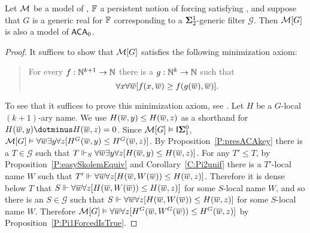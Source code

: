\begin{thm}\label{T:presACA}
Let $\mathcal{M}$ be a model of \ACAo, $\mathbb{F}$ a persistent notion of forcing satisfying \MCP,
and suppose that $G$ is a generic real for $\mathbb{F}$
corresponding to a $\mathbf{\Sigma}^1_2$-generic filter $\mathcal{G}$.
Then $\mathcal{M}[G]$ is also a model of $\mathsf{ACA}_0$.
\end{thm}
\begin{proof}
It suffices to show that $\mathcal{M}[G]$ satisfies
the following minimization axiom:
\begin{quote}
For every $f:\mathbb{N}^{k+1}\to\mathbb{N}$ there is a $g:\mathbb{N}^k\to\mathbb{N}$ such that
$$\forall x\forall\overline{w}[f(x,\overline{w})\geq f(g(\overline{w}),\overline{w})].$$
\end{quote}
To see that it suffices to prove this minimization axiom, see \cite{varMathias}.
Let $H$ be a $G$-local $(k+1)$-ary name.
We use $H(\overline{w},y)\leq H(\overline{w},z)$ as a shorthand for $H(\tup{w},y)\dotminus H(\tup{w},z)=0$.
Since $\mathcal{M}[G]\vDash \mathsf{I}{\mathbf{\Sigma}^0_1}$,
$\mathcal{M}[G]\vDash\forall\overline{w}\exists y\forall z[H^G(\overline{w},y)\leq H^G(\overline{w},z)]$.
By Proposition~\ref{P:presACAkey} there is a $T\in\mathcal{G}$
such that $T\Vdash_S\forall\overline{w}\exists y\forall z[H(\overline{w},y)\leq H(\overline{w},z)]$.
For any $T'\leq T$, by Proposition~\ref{P:easySkolemEquiv} and Corollary~\ref{C:Pi2unif}
there is a $T'$-local name $W$ such that $T'\Vdash\forall\overline{w}\forall z[H(\overline{w},W(\overline{w}))\leq H(\overline{w},z)]$.
Therefore it is dense below $T$ that
$S\Vdash\forall\overline{w}\forall z[H(\overline{w},W(\overline{w}))\leq H(\overline{w},z)]$ for some $S$-local name $W$,
and so there is an $S\in\mathcal{G}$ such that
$S\Vdash\forall\overline{w}\forall z[H(\overline{w},W(\overline{w}))\leq H(\overline{w},z)]$ for some $S$-local name $W$.
Therefore $\mathcal{M}[G]\vDash\forall\overline{w}\forall z[H^G(\overline{w},W^G(\overline{w}))\leq H^G(\overline{w},z)]$
by Proposition~\ref{P:Pi1ForcedIsTrue}.
\end{proof}

